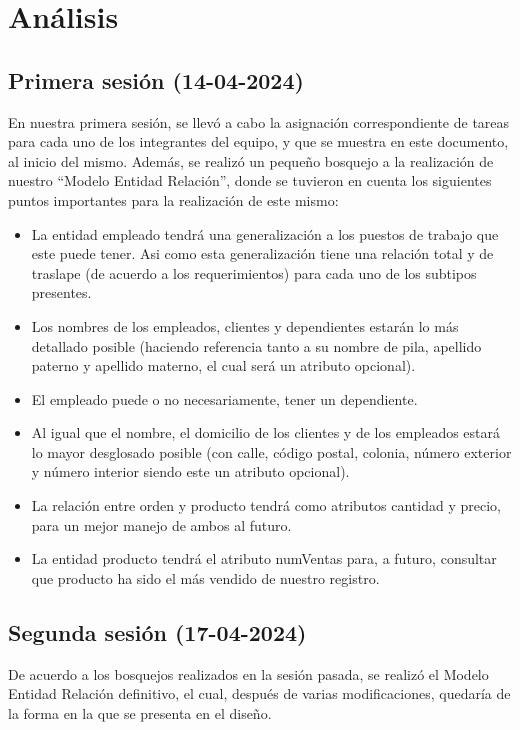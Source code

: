 \documentclass[12pt, a4paper]{article}
\begin{document}
	\section{Análisis}
	\subsection{Primera sesión (14-04-2024)}
	En nuestra primera sesión, se llevó a cabo la asignación correspondiente de tareas para cada uno de los integrantes del equipo, y que se muestra en este documento, al inicio del mismo. Además, se realizó un pequeño bosquejo a la realización de nuestro “Modelo Entidad Relación”, donde se tuvieron en cuenta los siguientes puntos importantes para la realización de este mismo:
	\begin{itemize}
		\item La entidad empleado tendrá una generalización a los puestos de trabajo que este puede tener. Asi como esta generalización tiene una relación total y de traslape (de acuerdo a los requerimientos) para cada uno de los subtipos presentes.
		\item Los nombres de los empleados, clientes y dependientes estarán lo más detallado posible (haciendo referencia tanto a su nombre de pila, apellido paterno y apellido materno, el cual será un atributo opcional).
		\item El empleado puede o no necesariamente, tener un dependiente.
		\item Al igual que el nombre, el domicilio de los clientes y de los empleados estará lo mayor desglosado posible (con calle, código postal, colonia, número exterior y número interior siendo este un atributo opcional).
		\item La relación entre orden y producto tendrá como atributos cantidad y precio, para un mejor manejo de ambos al futuro.
		\item La entidad producto tendrá el atributo numVentas para, a futuro, consultar que producto ha sido el más vendido de nuestro registro.
	\end{itemize}
	
	\subsection{Segunda sesión (17-04-2024)}
	De acuerdo a los bosquejos realizados en la sesión pasada, se realizó el Modelo Entidad Relación definitivo, el cual, después de varias modificaciones, quedaría de la forma en la que se presenta en el diseño.
	
\end{document}
